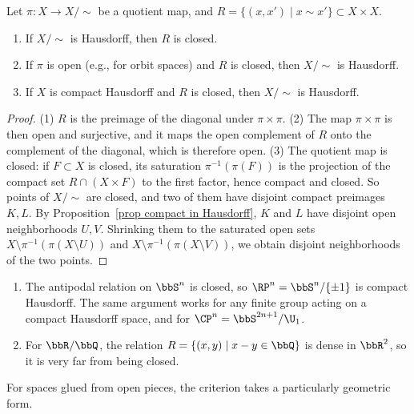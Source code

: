 \begin{prop}\label{prop Hausdorff quotients}
    Let $\pi:X\to X/{\sim}$ be a quotient map, and $R=\{(x,x')\mid x\sim x'\}\subset X\times X$.
    \begin{enumerate}
        \item If $X/{\sim}$ is Hausdorff, then $R$ is closed.
        \item If $\pi$ is open (e.g., for orbit spaces) and $R$ is closed, then $X/{\sim}$ is Hausdorff.
        \item If $X$ is compact Hausdorff and $R$ is closed, then $X/{\sim}$ is Hausdorff.
    \end{enumerate}
\end{prop}
\begin{proof}
    (1) $R$ is the preimage of the diagonal under $\pi\times\pi$. (2) The map $\pi\times\pi$ is then open and surjective, and it maps the open complement of $R$ onto the complement of the diagonal, which is therefore open. (3) The quotient map is closed: if $F\subset X$ is closed, its saturation $\pi^{-1}(\pi(F))$ is the projection of the compact set $R\cap(X\times F)$ to the first factor, hence compact and closed. So points of $X/{\sim}$ are closed, and two of them have disjoint compact preimages $K,L$. By Proposition~\ref{prop compact in Hausdorff}, $K$ and $L$ have disjoint open neighborhoods $U,V$. Shrinking them to the saturated open sets $X\setminus\pi^{-1}(\pi(X\setminus U))$ and $X\setminus\pi^{-1}(\pi(X\setminus V))$, we obtain disjoint neighborhoods of the two points.
\end{proof}

\begin{example}\label{example RPn Hausdorff}
    \begin{enumerate}
        \item The antipodal relation on $\bbS^n$ is closed, so $\RP^n=\bbS^n/\{\pm1\}$ is compact Hausdorff. The same argument works for any finite group acting on a compact Hausdorff space, and for $\CP^n=\bbS^{2n+1}/\U_1$.
        \item For $\bbR/\bbQ$, the relation $R=\{(x,y)\mid x-y\in\bbQ\}$ is dense in $\bbR^2$, so it is very far from being closed.
    \end{enumerate}
\end{example}

For spaces glued from open pieces, the criterion takes a particularly geometric form.

